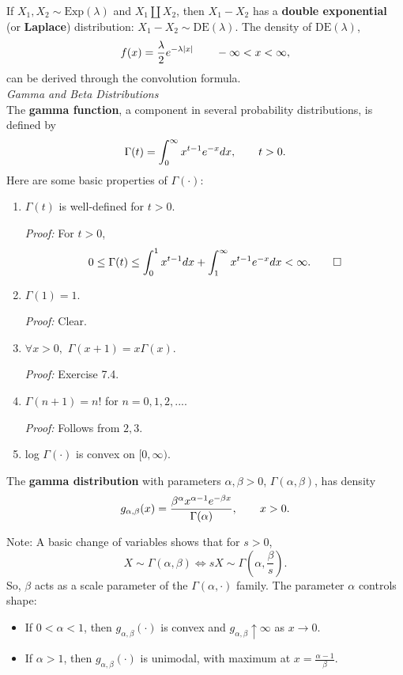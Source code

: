 \documentclass[12pt,oneside]{article}
\begin{document}
If $X_1, X_2 \sim \mbox{Exp} (\lambda)$ and $X_1 \coprod X_2$, then $X_1 - X_2$ has a \textbf{double exponential} (or \textbf{Laplace}) distribution:  $X_1 - X_2 \sim \mbox{DE}(\lambda)$.  The density of $\mbox{DE}(\lambda)$,
\[f(x) = \frac{\lambda}{2} e^{-\lambda |x|} \hspace{20 pt} -\infty < x < \infty ,\]
can be derived through the convolution formula. \\

\noindent \emph{Gamma and Beta Distributions}\\

The \textbf{gamma function}, a component in several probability distributions,  is defined by \[\Gamma (t)  = \int_0^\infty x^{t-1}e^{-x} dx, \hspace{20 pt} t > 0.\]
Here are some basic properties of $\Gamma(\cdot):$
\begin{enumerate}
\item $\Gamma(t)$ is well-defined for $t>0$.

\emph{Proof:} For $t>0$, \[0 \leq \Gamma(t) \leq \int_0^1 x^{t-1} dx + \int_1^\infty x^{t-1}e^{-x}dx < \infty. \hspace{20 pt} \Box \]

\item $\Gamma (1) = 1$.

\emph{Proof:} Clear.

\item $\forall x>0,$ $\Gamma(x+1) = x \Gamma(x)$.

\emph{Proof:} Exercise 7.4.

\item $\Gamma (n+1) = n!$ for $n=0,1,2,...$.

\emph{Proof:} Follows from $2,3$.

\item log $\Gamma(\cdot)$ is convex on $[0,\infty)$.\\
\end{enumerate}

\noindent The \textbf{gamma distribution} with parameters $\alpha, \beta > 0$, $\Gamma(\alpha,\beta)$, has density
\[g_{\alpha, \beta} (x) = \frac{\beta^{\alpha} x^{\alpha-1} e^{-\beta x}}{\Gamma (\alpha)}, \hspace{20 pt} x>0.\]

\noindent Note: A basic change of variables shows that for $s>0$, \[X \sim \Gamma(\alpha, \beta) \iff sX \sim \Gamma \left(\alpha, \frac{\beta}{s} \right). \]
So, $\beta$ acts as a scale parameter of the $\Gamma(\alpha, \cdot)$ family.  The parameter $\alpha$ controls shape:
\begin{itemize}
\item If $0 < \alpha < 1$, then $g_{\alpha, \beta} (\cdot)$ is convex and $g_{\alpha,\beta} \uparrow \infty$ as $x \rightarrow 0$.
\item If $\alpha > 1$, then $g_{\alpha, \beta} (\cdot)$ is unimodal, with maximum at $x = \frac{\alpha-1}{\beta}$.
\end{itemize}
\end{document}
